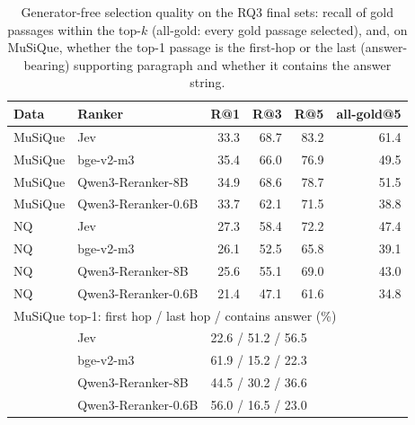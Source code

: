 \begin{table}[tp]
\centering
\scriptsize
\setlength{\tabcolsep}{3pt}
\caption{Generator-free selection quality on the RQ3 final sets: recall of gold passages within the top-$k$ (all-gold: every gold passage selected), and, on MuSiQue, whether the top-1 passage is the first-hop or the last (answer-bearing) supporting paragraph and whether it contains the answer string.}
\label{tab:ragsel}
\begin{tabular}{llrrrr}
\toprule
Data & Ranker & R@1 & R@3 & R@5 & all-gold@5 \\
\midrule
MuSiQue & Jev & 33.3 & 68.7 & 83.2 & 61.4 \\
MuSiQue & bge-v2-m3 & 35.4 & 66.0 & 76.9 & 49.5 \\
MuSiQue & Qwen3-Reranker-8B & 34.9 & 68.6 & 78.7 & 51.5 \\
MuSiQue & Qwen3-Reranker-0.6B & 33.7 & 62.1 & 71.5 & 38.8 \\
NQ & Jev & 27.3 & 58.4 & 72.2 & 47.4 \\
NQ & bge-v2-m3 & 26.1 & 52.5 & 65.8 & 39.1 \\
NQ & Qwen3-Reranker-8B & 25.6 & 55.1 & 69.0 & 43.0 \\
NQ & Qwen3-Reranker-0.6B & 21.4 & 47.1 & 61.6 & 34.8 \\
\midrule
\multicolumn{6}{l}{MuSiQue top-1: \quad first hop / last hop / contains answer (\%)} \\
 & Jev & \multicolumn{4}{l}{22.6 / 51.2 / 56.5} \\
 & bge-v2-m3 & \multicolumn{4}{l}{61.9 / 15.2 / 22.3} \\
 & Qwen3-Reranker-8B & \multicolumn{4}{l}{44.5 / 30.2 / 36.6} \\
 & Qwen3-Reranker-0.6B & \multicolumn{4}{l}{56.0 / 16.5 / 23.0} \\
\bottomrule
\end{tabular}
\end{table}